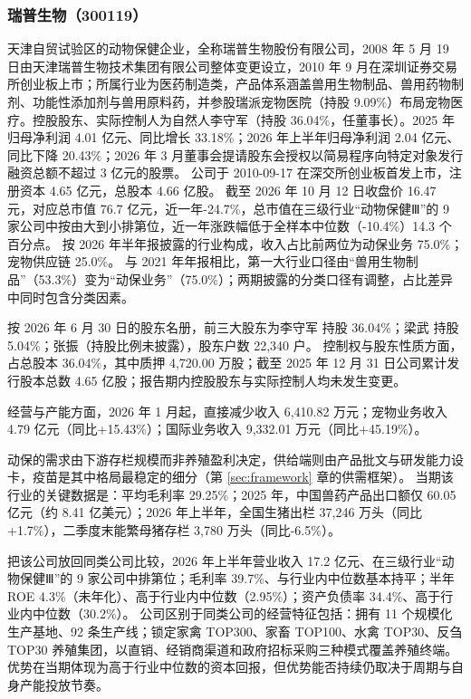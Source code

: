 \subsubsection{瑞普生物（300119）}
\label{co:300119}

 天津自贸试验区的动物保健企业，全称瑞普生物股份有限公司，2008 年 5 月 19 日由天津瑞普生物技术集团有限公司整体变更设立，2010 年 9 月在深圳证券交易所创业板上市；所属行业为医药制造类，产品体系涵盖兽用生物制品、兽用药物制剂、功能性添加剂与兽用原料药，并参股瑞派宠物医院（持股 9.09\%）布局宠物医疗。控股股东、实际控制人为自然人李守军（持股 36.04\%，任董事长）。2025 年归母净利润 4.01 亿元、同比增长 33.18\%；2026 年上半年归母净利润 2.04 亿元、同比下降 20.43\%；2026 年 3 月董事会提请股东会授权以简易程序向特定对象发行融资总额不超过 3 亿元的股票。 公司于 2010-09-17 在深交所创业板首发上市，注册资本 4.65 亿元，总股本 4.66 亿股。 截至 2026 年 10 月 12 日收盘价 16.47 元，对应总市值 76.7 亿元，近一年-24.7\%，总市值在三级行业“动物保健Ⅲ”的 9 家公司中按由大到小排第位，近一年涨跌幅低于全样本中位数（-10.4\%）14.3 个百分点。 按 2026 年半年报披露的行业构成，收入占比前两位为动保业务 75.0\%；宠物供应链 25.0\%。 与 2021 年年报相比，第一大行业口径由“兽用生物制品”（53.3\%）变为“动保业务”（75.0\%）；两期披露的分类口径有调整，占比差异中同时包含分类因素。

 按 2026 年 6 月 30 日的股东名册，前三大股东为李守军 持股 36.04\%；梁武 持股 5.04\%；张振（持股比例未披露），股东户数 22,340 户。 控制权与股东性质方面，占总股本 36.04\%，其中质押 4,720.00 万股；截至 2025 年 12 月 31 日公司累计发行股本总数 4.65 亿股；报告期内控股股东与实际控制人均未发生变更。

 经营与产能方面，2026 年 1 月起，直接减少收入 6,410.82 万元；宠物业务收入 4.79 亿元（同比+15.43\%）；国际业务收入 9,332.01 万元（同比+45.19\%）。

 动保的需求由下游存栏规模而非养殖盈利决定，供给端则由产品批文与研发能力设卡，疫苗是其中格局最稳定的细分（第 \ref{sec:framework} 章的供需框架）。 当期该行业的关键数据是：平均毛利率 29.25\%；2025 年，中国兽药产品出口额仅 60.05 亿元（约 8.41 亿美元）；2026 年上半年，全国生猪出栏 37,246 万头（同比+1.7\%），二季度末能繁母猪存栏 3,780 万头（同比-6.5\%）。

 把该公司放回同类公司比较，2026 年上半年营业收入 17.2 亿元、在三级行业“动物保健Ⅲ”的 9 家公司中排第位；毛利率 39.7\%、与行业内中位数基本持平；半年 ROE 4.3\%（未年化）、高于行业内中位数（2.95\%）；资产负债率 34.4\%、高于行业内中位数（30.2\%）。 公司区别于同类公司的经营特征包括：拥有 11 个规模化生产基地、92 条生产线；锁定家禽 TOP300、家畜 TOP100、水禽 TOP30、反刍 TOP30 养殖集团，以直销、经销商渠道和政府招标采购三种模式覆盖养殖终端。 优势在当期体现为高于行业中位数的资本回报，但优势能否持续仍取决于周期与自身产能投放节奏。

